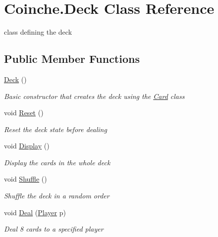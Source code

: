\hypertarget{class_coinche_1_1_deck}{}\section{Coinche.\+Deck Class Reference}
\label{class_coinche_1_1_deck}


class defining the deck  


\subsection*{Public Member Functions}
\begin{DoxyCompactItemize}
\item 
\hyperlink{class_coinche_1_1_deck_a63fabc6c73f999e4cc1fd55e368f6a30}{Deck} ()
\begin{DoxyCompactList}\small\item\em Basic constructor that creates the deck using the \hyperlink{class_coinche_1_1_card}{Card} class \end{DoxyCompactList}\item 
void \hyperlink{class_coinche_1_1_deck_a2c869fc45763e7c847d51db4016f30a9}{Reset} ()
\begin{DoxyCompactList}\small\item\em Reset the deck state before dealing \end{DoxyCompactList}\item 
void \hyperlink{class_coinche_1_1_deck_a05027ece37a4f59773be023f76c64947}{Display} ()
\begin{DoxyCompactList}\small\item\em Display the cards in the whole deck \end{DoxyCompactList}\item 
void \hyperlink{class_coinche_1_1_deck_a908c7e4a2e22545c903999108b848727}{Shuffle} ()
\begin{DoxyCompactList}\small\item\em Shuffle the deck in a random order \end{DoxyCompactList}\item 
void \hyperlink{class_coinche_1_1_deck_a1f56a0aeaa64e994350b1c5662c36b5f}{Deal} (\hyperlink{class_coinche_1_1_player}{Player} p)
\begin{DoxyCompactList}\small\item\em Deal 8 cards to a specified player \end{DoxyCompactList}\end{DoxyCompactItemize}
